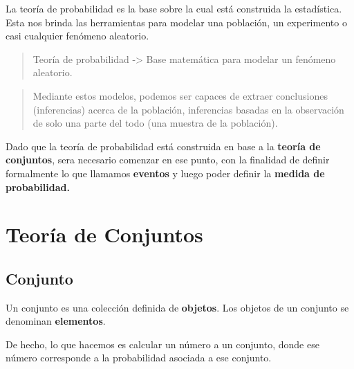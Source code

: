 \documentclass[
  letterpaper,
  DIV=11,
  numbers=noendperiod]{scrreprt}
\begin{document}
La teoría de probabilidad es la base sobre la cual está construida la
estadística. Esta nos brinda las herramientas para modelar una
población, un experimento o casi cualquier fenómeno aleatorio.

\begin{quote}
Teoría de probabilidad -\textgreater{} Base matemática para modelar un
fenómeno aleatorio.
\end{quote}

\begin{quote}
Mediante estos modelos, podemos ser capaces de extraer conclusiones
(inferencias) acerca de la población, inferencias basadas en la
observación de solo una parte del todo (una muestra de la población).
\end{quote}

Dado que la teoría de probabilidad está construida en base a la
\textbf{teoría de conjuntos}, sera necesario comenzar en ese punto, con
la finalidad de definir formalmente lo que llamamos \textbf{eventos} y
luego poder definir la \textbf{medida de probabilidad.}

\section{Teoría de Conjuntos}\label{teoruxeda-de-conjuntos}

\subsection{Conjunto}\label{conjunto}

\begin{tcolorbox}[enhanced jigsaw, arc=.35mm, bottomrule=.15mm, bottomtitle=1mm, breakable, colback=white, colbacktitle=quarto-callout-note-color!10!white, colframe=quarto-callout-note-color-frame, coltitle=black, left=2mm, leftrule=.75mm, opacityback=0, opacitybacktitle=0.6, rightrule=.15mm, title=\textcolor{quarto-callout-note-color}{\faInfo}\hspace{0.5em}{Definición de Conjunto}, titlerule=0mm, toprule=.15mm, toptitle=1mm]

Un conjunto es una colección definida de \textbf{objetos}. Los objetos
de un conjunto se denominan \textbf{elementos}.

\end{tcolorbox}

\begin{tcolorbox}[enhanced jigsaw, arc=.35mm, bottomrule=.15mm, bottomtitle=1mm, breakable, colback=white, colbacktitle=quarto-callout-warning-color!10!white, colframe=quarto-callout-warning-color-frame, coltitle=black, left=2mm, leftrule=.75mm, opacityback=0, opacitybacktitle=0.6, rightrule=.15mm, title={La probabilidad viene de los conjuntos}, titlerule=0mm, toprule=.15mm, toptitle=1mm]

De hecho, lo que hacemos es calcular un número a un conjunto, donde ese
número corresponde a la probabilidad asociada a ese conjunto.

\end{tcolorbox}
\end{document}
